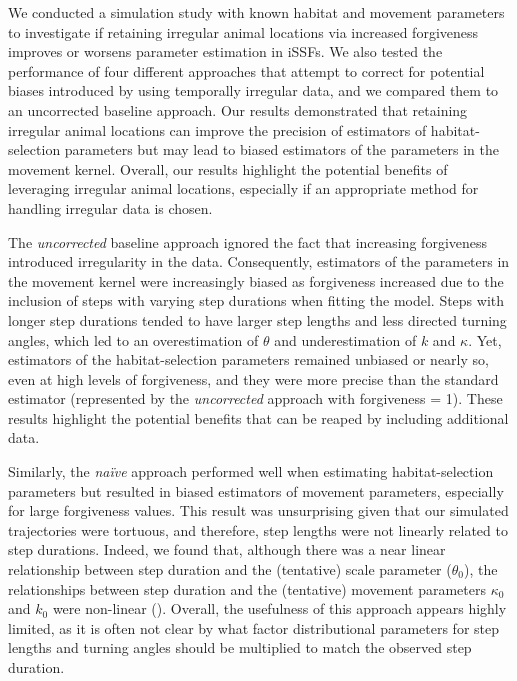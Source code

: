 \documentclass[../FinalThesis.tex]{subfiles}
\begin{document}
We conducted a simulation study with known habitat and movement parameters to
investigate if retaining irregular animal locations via increased forgiveness
improves or worsens parameter estimation in iSSFs. We also tested the
performance of four different approaches that attempt to correct for potential
biases introduced by using temporally irregular data, and we compared them to an
uncorrected baseline approach. Our results demonstrated that retaining irregular
animal locations can improve the precision of estimators of habitat-selection
parameters but may lead to biased estimators of the parameters in
the movement kernel. Overall, our results highlight the potential benefits of
leveraging irregular animal locations, especially if an appropriate method for
handling irregular data is chosen.

The \textit{uncorrected} baseline approach ignored the fact that increasing
forgiveness introduced irregularity in the data. Consequently, estimators of the
parameters in the movement kernel were increasingly biased as forgiveness
increased due to the inclusion of steps with varying step durations when fitting
the model. Steps with longer step durations tended to have larger step lengths
and less directed turning angles, which led to an overestimation of $\theta$ and
underestimation of $k$ and $\kappa$. Yet, estimators of the habitat-selection
parameters remained unbiased or nearly so, even at high levels of forgiveness,
and they were more precise than the standard estimator (represented by the
\textit{uncorrected} approach with forgiveness = 1). These results highlight the
potential benefits that can be reaped by including additional data.

Similarly, the \textit{na\"ive} approach performed well when estimating
habitat-selection parameters but resulted in biased estimators of movement
parameters, especially for large forgiveness values. This result was
unsurprising given that our simulated trajectories were tortuous, and therefore,
step lengths were not linearly related to step durations. Indeed, we found that,
although there was a near linear relationship between step duration and the
(tentative) scale parameter ($\theta_0$), the relationships between step
duration and the (tentative) movement parameters $\kappa_0$ and $k_0$ were
non-linear (). Overall, the usefulness of this
approach appears highly limited, as it is often not clear by what factor
distributional parameters for step lengths and turning angles should be
multiplied to match the observed step duration.
\end{document}
